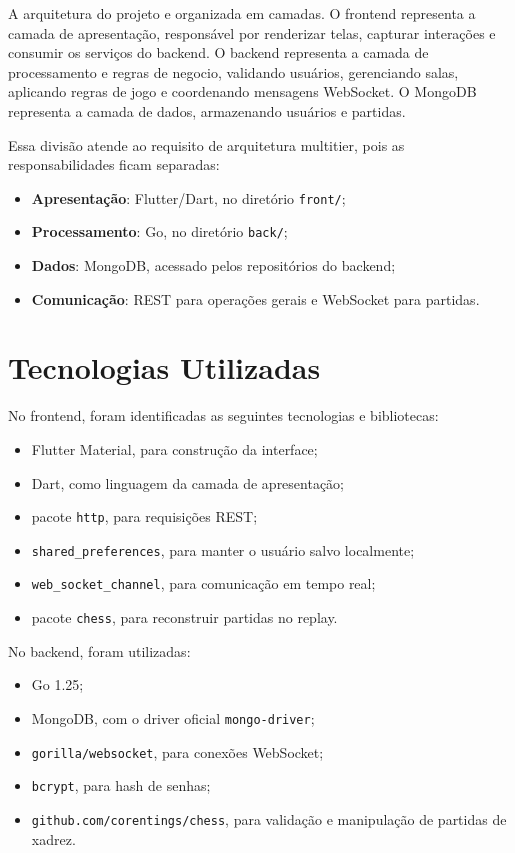 \documentclass[12pt]{article}
\begin{document}
A arquitetura do projeto e organizada em camadas. O frontend representa a camada de apresentação, responsável por renderizar telas, capturar interações e consumir os serviços do backend. O backend representa a camada de processamento e regras de negocio, validando usuários, gerenciando salas, aplicando regras de jogo e coordenando mensagens WebSocket. O MongoDB representa a camada de dados, armazenando usuários e partidas.

Essa divisão atende ao requisito de arquitetura multitier, pois as responsabilidades ficam separadas:

\begin{itemize}
    \item \textbf{Apresentação}: Flutter/Dart, no diretório \texttt{front/};
    \item \textbf{Processamento}: Go, no diretório \texttt{back/};
    \item \textbf{Dados}: MongoDB, acessado pelos repositórios do backend;
    \item \textbf{Comunicação}: REST para operações gerais e WebSocket para partidas.
\end{itemize}

\section{Tecnologias Utilizadas}

No frontend, foram identificadas as seguintes tecnologias e bibliotecas:

\begin{itemize}
    \item Flutter Material, para construção da interface;
    \item Dart, como linguagem da camada de apresentação;
    \item pacote \texttt{http}, para requisições REST;
    \item \texttt{shared\_preferences}, para manter o usuário salvo localmente;
    \item \texttt{web\_socket\_channel}, para comunicação em tempo real;
    \item pacote \texttt{chess}, para reconstruir partidas no replay.
\end{itemize}

No backend, foram utilizadas:

\begin{itemize}
    \item Go 1.25;
    \item MongoDB, com o driver oficial \texttt{mongo-driver};
    \item \texttt{gorilla/websocket}, para conexões WebSocket;
    \item \texttt{bcrypt}, para hash de senhas;
    \item \texttt{github.com/corentings/chess}, para validação e manipulação de partidas de xadrez.
\end{itemize}
\end{document}
